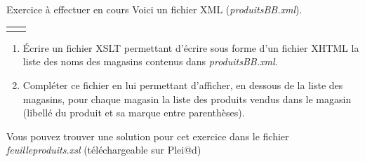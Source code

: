 \begin{frame}{Exercice \`a effectuer en cours}
Voici un fichier XML (\textit{produitsBB.xml}).

\begin{tabular}{cc}
\begin{minipage}{0.48\textwidth}

\end{minipage}
&
\begin{minipage}{0.53\textwidth}

\end{minipage}
\end{tabular}

\framebreak

\begin{exoblock}

\begin{enumerate}
\item \'Ecrire un fichier XSLT permettant d'\'ecrire sous forme d'un fichier XHTML la liste des noms des magasins contenus dans \textit{produitsBB.xml}.
\item Compl\'eter ce fichier en lui permettant d'afficher, en dessous de la liste des magasins, pour chaque magasin la liste des produits vendus dans le magasin (libell\'e du produit et sa marque entre parenth\`eses).
\end{enumerate}
\end{exoblock}

Vous pouvez trouver une solution pour cet exercice dans le fichier \textit{feuilleproduits.xsl} (t\'el\'echargeable sur Plei@d)

\end{frame}

